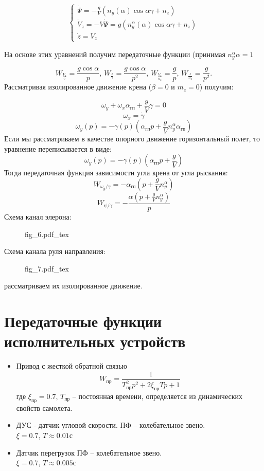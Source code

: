 \documentclass{article}
\begin{document}
\begin{equation}
	\begin{cases}
		\dot{\Psi} = -\frac{g}{V}(n_y(\alpha)\cos{\alpha}\gamma + n_z)
		\\
		\dot{V}_z = -V \dot{\Psi} = g(n_y^{\alpha}(\alpha) \cos{\alpha\gamma} +
		n_z) \\
		\dot{z} = V_z
	\end{cases}
\end{equation}

На основе этих уравнений получим передаточные функции (принимая $n_y^{\alpha}
	\alpha =1 $

\[
	W_{\frac{V_z}{\gamma}} = \frac{g\cos{\alpha}}{p}, \, W_{\frac{z}{\gamma}} =
	\frac{g\cos{\alpha}}{p^2}, \, W_{\frac{V_z}{n_z}}= \frac{g}{p}, \,
	W_{\frac{z}{n_z}} = \frac{g}{p^2}.
\]
Рассматривая изолированное движение крена ($\beta = 0$ и $m_z = 0$) получим:

\[
	\omega_y + \omega_x \alpha_{\text{гп}} + \frac{g}{V}\gamma = 0
\]
\[
	\omega_x = \dot{\gamma}
\]
\[
	\omega_y(p) = -\gamma(p)(\alpha_\text{гп}p + \frac{g}{V}n_y^\alpha
	\alpha_\text{гп})
\]
Если мы рассматриваем в качестве опорного движение горизонтальный полет, то
уравнение переписывается в виде:
\[
	\omega_y(p) = -\gamma(p)(\alpha_\text{гп}p + \frac{g}{V})
\]
Тогда передаточная функция зависимости угла крена от угла рыскания:
\[
	W_{\omega_y/\gamma} = -\alpha_\text{гп} (p+\frac{g}{V}n_y^\alpha)
\]
\[
	W_{\psi/\gamma} = -\frac{\alpha(p + \frac{g}{V} n_y^\alpha)} {p}
\]
Схема канал элерона:
\begin{figure}[H]
	\centering
	{fig_6.pdf_tex}
\end{figure}
Схема канала руля направления:
\begin{figure}[H]
	\centering
	{fig_7.pdf_tex}
\end{figure}
рассматриваем их изолированное движение.

\section{Передаточные функции исполнительных устройств}

\begin{itemize}
	\item Привод с жесткой обратной связью
	      \[
		      W_\text{пр} = \frac{1}{T_\text{пр}^2p^2 + 2 \xi_\text{пр} Tp + 1}
	      \]
	      где $\xi_\text{пр} = 0.7$, $T_\text{пр}$ -- постоянная времени,
	      определяется из динамических свойств самолета.

	\item ДУС - датчик угловой скорости.
	      ПФ -- колебательное звено.\\
	      $\xi = 0.7$, $T \approx 0.01 \text{с}$

	\item Датчик перегрузок
	      ПФ -- колебательное звено.\\
	      $\xi = 0.7$, $T \approx 0.005 \text{с}$
\end{itemize}
\end{document}
